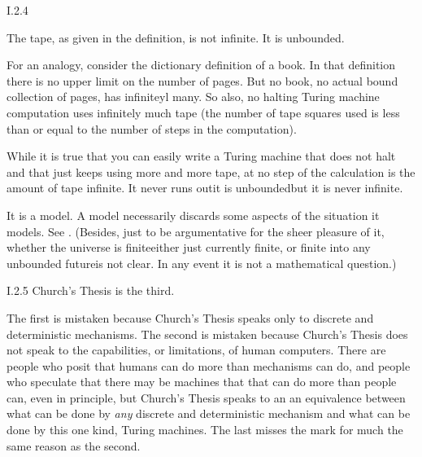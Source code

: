 %
\begin{ans}{I.2.4}
\begin{exparts}
\item The tape, as given in the definition, is not infinite.
It is unbounded.

For an analogy, consider the dictionary definition of a book.
In that definition there is no upper limit on the number of pages.
But no book, no actual bound collection of pages, has infiniteyl many.
So also, no halting Turing machine computation uses infinitely much tape
(the number of tape squares used is less than or equal to the number of
steps in the computation).

While it is true that you can easily write a Turing machine that does not
halt and that just keeps using more and more tape, at no step of the
calculation is the amount of tape infinite.
It never runs out\Dash it is unbounded\Dash but it is never infinite.

\item It is a model.
A model necessarily discards some aspects of the situation it models.
See \autocite{wiki:MapStory}.
(Besides, just to be argumentative for the sheer pleasure of it,
whether the universe is finite\Dash either just currently
finite, or finite into any unbounded future\Dash is not clear.
In any event it is not a mathematical question.)
\end{exparts}
\end{ans}
%
\begin{ans}{I.2.5}
Church's Thesis is the third.

The first is mistaken because Church's Thesis speaks only to discrete and
deterministic mechanisms.
The second is mistaken because Church's Thesis does not speak to the
capabilities, or limitations, of human computers.
There are people who posit that humans can do more than mechanisms can do,
and people who speculate that there may be machines that that can do more
than people can, even in principle, but Church's Thesis speaks to an
an equivalence between what can be done by \emph{any} discrete and
deterministic mechanism and what can be done by this one kind,
Turing machines.
The last misses the mark for much the same reason as the second.
\end{ans}
%

